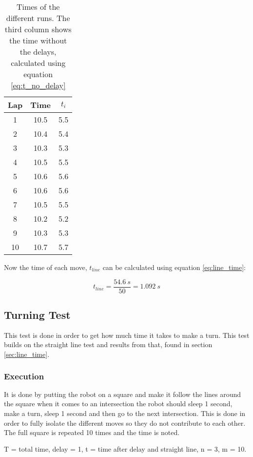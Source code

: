 \documentclass[a4paper,10pt]{article}
\begin{document}
\begin{table} [H]
\centering
 \begin{tabular}{|c|c|c|}
  \hline Lap & Time  & $t_i$ \\ \hline
  1 & 10.5  & 5.5 \\  \hline
  2 & 10.4  & 5.4 \\  \hline
  3 & 10.3  & 5.3 \\  \hline
  4 & 10.5  & 5.5 \\  \hline
  5 & 10.6  & 5.6 \\  \hline
  6 & 10.6  & 5.6 \\  \hline
  7 & 10.5  & 5.5 \\  \hline
  8 & 10.2  & 5.2 \\  \hline
  9 & 10.3  & 5.3 \\  \hline
  10 & 10.7 &  5.7 \\ \hline
 \end{tabular}
 \caption{Times of the different runs. The third column shows the time without the delays, calculated using equation \ref{eq:t_no_delay}}
 \label{tab:time_straight}
\end{table}

Now the time of each move, $t_{line}$ can be calculated using equation \ref{eq:line_time}:

$$
t_{line} = \frac{54.6\ s}{50} = 1.092\ s
$$

\subsection{Turning Test} \label{sec:turn_time}

This test is done in order to get how much time it takes to make a turn. This test builds on the straight line test and results from that, found in section \ref{sec:line_time}.

\subsubsection{Execution}
It is done by putting the robot on a square and make it follow the lines around the square when it comes to an intersection the robot should sleep 1 second, make a turn, sleep 1 second and then go to the next intersection. This is done in order to fully isolate the different moves so they do not contribute to each other. The full square is repeated 10 times and the time is noted. 

T = total time, delay = 1, t = time after delay and straight line, n = 3, m = 10.
\end{document}
